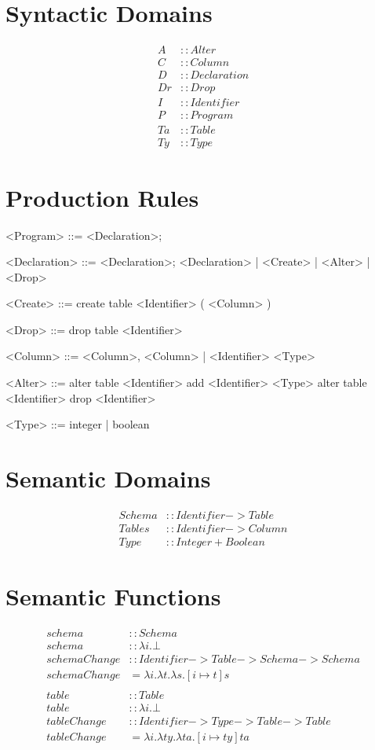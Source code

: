 \documentclass[12pt]{article}
\begin{document}
\section{Syntactic Domains}
\begin{align*}
  A &:: Alter \\
  C &:: Column \\
  D &:: Declaration \\
  Dr &:: Drop \\
  I &:: Identifier \\
  P &:: Program \\
  Ta &:: Table \\
  Ty &:: Type
\end{align*}

\section{Production Rules}
\begin{grammar}
  <Program> ::= <Declaration>;

  <Declaration> ::= <Declaration>; <Declaration> | <Create> | <Alter> | <Drop>

  <Create> ::= create table <Identifier> ( <Column> )

  <Drop> ::= drop table <Identifier>

  <Column> ::= <Column>, <Column> | <Identifier> <Type>

  <Alter> ::= alter table <Identifier> add <Identifier> <Type>
           \alt alter table <Identifier> drop <Identifier>

  <Type> ::= integer | boolean
\end{grammar}

\section{Semantic Domains}
\begin{align*}
  Schema &:: Identifier -> Table \\
  Tables &:: Identifier -> Column \\
  Type &:: Integer + Boolean
\end{align*}

\section{Semantic Functions}
\begin{align*}
  schema &:: Schema \\
  schema &:: \lambda i.\bot \\
  schemaChange &:: Identifier -> Table -> Schema -> Schema \\
  schemaChange &= \lambda i. \lambda t. \lambda s. [ i \mapsto t ]s \\
  \\
  table &:: Table \\
  table &:: \lambda i.\bot \\
  tableChange &:: Identifier -> Type -> Table -> Table \\
  tableChange &= \lambda i. \lambda ty. \lambda ta. [ i \mapsto ty ]ta
\end{align*}
\end{document}
